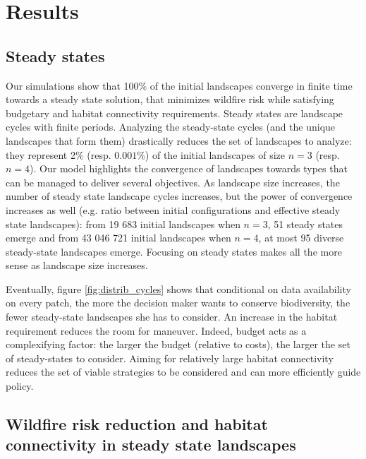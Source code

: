 \section{Results}
\label{section:results}

\subsection{Steady states}
Our simulations show that 100\% of the initial landscapes converge in finite time towards a steady state solution, that minimizes wildfire risk while satisfying budgetary and habitat connectivity requirements. Steady states are landscape cycles with finite periods. Analyzing the steady-state cycles (and the unique landscapes that form them) drastically reduces the set of landscapes to analyze: they represent 2\% (resp. $0.001\%$) of the initial landscapes of size $n=3$ (resp. $n=4$). Our model highlights the convergence of landscapes towards types that can be managed to deliver several objectives. As landscape size increases, the number of steady state landscape cycles increases, but the power of convergence increases as well (e.g. ratio between initial configurations and effective steady state landscapes): from 19 683 initial landscapes when $n=3$, 51 steady states emerge and from 43 046 721 initial landscapes when $n=4$, at most 95 diverse steady-state landscapes emerge. Focusing on steady states makes all the more sense as landscape size increases. 

Eventually, figure \ref{fig:distrib_cycles} shows that conditional on data availability on every patch, the more the decision maker wants to conserve biodiversity, the fewer steady-state landscapes she has to consider. An increase in the habitat requirement reduces the room for maneuver. Indeed, budget acts as a complexifying factor: the larger the budget (relative to costs), the larger the set of steady-states to consider. 
Aiming for relatively large habitat connectivity reduces the set of viable strategies to be considered and can more efficiently guide policy. 

\subsection{Wildfire risk reduction and habitat connectivity in steady state landscapes}

